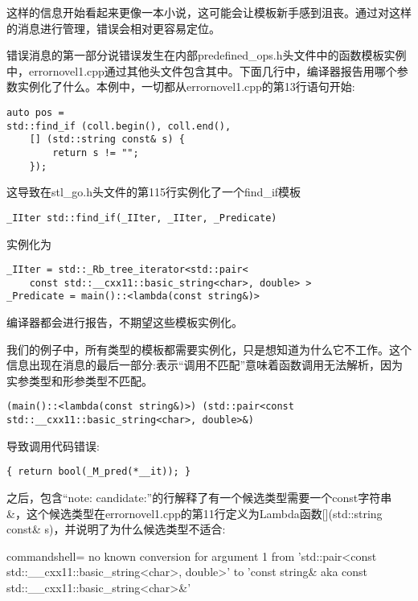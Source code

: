 这样的信息开始看起来更像一本小说，这可能会让模板新手感到沮丧。通过对这样的消息进行管理，错误会相对更容易定位。

错误消息的第一部分说错误发生在内部predefined\_ops.h头文件中的函数模板实例中，errornovel1.cpp通过其他头文件包含其中。下面几行中，编译器报告用哪个参数实例化了什么。本例中，一切都从errornovel1.cpp的第13行语句开始:

\begin{lstlisting}[style=styleCXX]
auto pos = 
std::find_if (coll.begin(), coll.end(),
	[] (std::string const& s) {
		return s != "";
	});
\end{lstlisting}

这导致在stl\_go.h头文件的第115行实例化了一个find\_if模板

\begin{lstlisting}[style=styleCXX]
_IIter std::find_if(_IIter, _IIter, _Predicate)
\end{lstlisting}

实例化为

\begin{lstlisting}[style=styleCXX]
_IIter = std::_Rb_tree_iterator<std::pair<
	const std::__cxx11::basic_string<char>, double> >
_Predicate = main()::<lambda(const string&)>
\end{lstlisting}

编译器都会进行报告，不期望这些模板实例化。

我们的例子中，所有类型的模板都需要实例化，只是想知道为什么它不工作。这个信息出现在消息的最后一部分:表示“调用不匹配”意味着函数调用无法解析，因为实参类型和形参类型不匹配。

\begin{lstlisting}[style=styleCXX]
(main()::<lambda(const string&)>) (std::pair<const std::__cxx11::basic_string<char>, double>&)
\end{lstlisting}

导致调用代码错误:

\begin{lstlisting}[style=styleCXX]
{ return bool(_M_pred(*__it)); }
\end{lstlisting}

之后，包含“note: candidate:”的行解释了有一个候选类型需要一个const字符串\&，这个候选类型在errornovel1.cpp的第11行定义为Lambda函数[](std::string const\& s)，并说明了为什么候选类型不适合:

{\scriptsize
\begin{tcblisting}{commandshell={}}
no known conversion for argument 1
from ’std::pair<const std::__cxx11::basic_string<char>, double>’
to ’const string& {aka const std::__cxx11::basic_string<char>&}’
\end{tcblisting}
}

